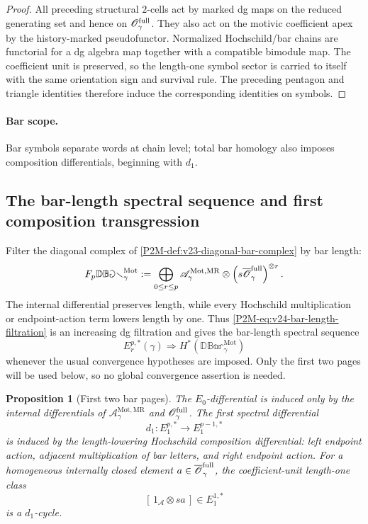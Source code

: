 \documentclass[11pt]{article}
\newtheorem{proposition}[theorem]{Proposition}
\theoremstyle{remark}
\newcommand{\Mot}{\mathrm{Mot}}
\newcommand{\MR}{\mathrm{MR}}
\begin{document}
\begin{proof}
All preceding structural \(2\)-cells act by marked dg maps on the reduced
generating set and hence on
\(\mathscr O_\gamma^{\rm full}\).  They also act on the motivic coefficient
apex by the history-marked pseudofunctor.  Normalized Hochschild/bar chains are functorial
for a dg algebra map together with a compatible bimodule map.  The coefficient
unit is preserved, so the length-one symbol sector is carried to itself with
the same orientation sign and survival rule.  The preceding pentagon and
triangle identities therefore induce the corresponding identities on symbols.
\end{proof}

\paragraph{Bar scope.}
Bar symbols separate words at chain level; total bar homology also imposes
composition differentials, beginning with \(d_1\).


\subsection{The bar-length spectral sequence and first composition transgression}


Filter the diagonal complex of
\cref{P2M-def:v23-diagonal-bar-complex} by bar length:
\begin{equation}\label{P2M-eq:v24-bar-length-filtration}
 F_p\mathbb{DBar}_{\gamma}^{\Mot}
 :=
 \bigoplus_{0\le r\le p}
 \mathscr A_\gamma^{\Mot,\MR}
 \otimes
 \left(s\overline{\mathscr O}_\gamma^{\rm full}\right)^{\otimes r}.
\end{equation}
The internal differential preserves length, while every Hochschild
multiplication or endpoint-action term lowers length by one.  Thus
\eqref{P2M-eq:v24-bar-length-filtration} is an increasing dg filtration and gives
the bar-length spectral sequence
\[
 E_r^{p,*}(\gamma)\Longrightarrow
 H^*\!\left(\mathbb{DBar}_{\gamma}^{\Mot}\right)
\]
whenever the usual convergence hypotheses are imposed.  Only the first two
pages will be used below, so no global convergence assertion is needed.

\begin{proposition}[First two bar pages]
\label{P2M-prop:v24-first-two-bar-pages}
The \(E_0\)-differential is induced only by the internal differentials of
\(\mathscr A_\gamma^{\Mot,\MR}\) and
\(\mathscr O_\gamma^{\rm full}\).  The first spectral differential
\[
 d_1:E_1^{p,*}\longrightarrow E_1^{p-1,*}
\]
is induced by the length-lowering Hochschild composition differential:
left endpoint action, adjacent multiplication of bar letters, and right
endpoint action.
For a homogeneous internally closed element
\(a\in\overline{\mathscr O}_\gamma^{\rm full}\), the coefficient-unit
length-one class
\[
 [\,1_{\mathscr A}\otimes sa\,]\in E_1^{1,*}
\]
is a \(d_1\)-cycle.
\end{proposition}
\end{document}
